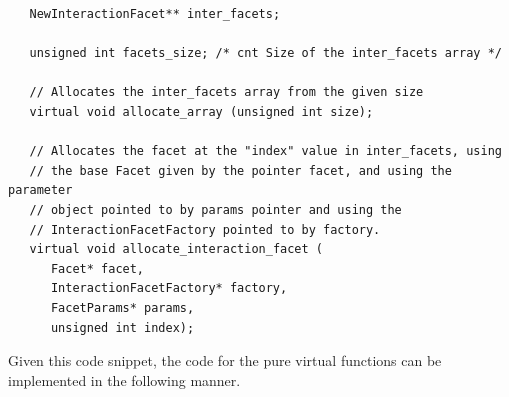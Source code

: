 \begin{verbatim}
   NewInteractionFacet** inter_facets;

   unsigned int facets_size; /* cnt Size of the inter_facets array */

   // Allocates the inter_facets array from the given size
   virtual void allocate_array (unsigned int size);

   // Allocates the facet at the "index" value in inter_facets, using
   // the base Facet given by the pointer facet, and using the parameter
   // object pointed to by params pointer and using the
   // InteractionFacetFactory pointed to by factory.
   virtual void allocate_interaction_facet (
      Facet* facet,
      InteractionFacetFactory* factory,
      FacetParams* params,
      unsigned int index);
\end{verbatim}

Given this code snippet, the code for the pure virtual functions can be implemented in
the following manner.

